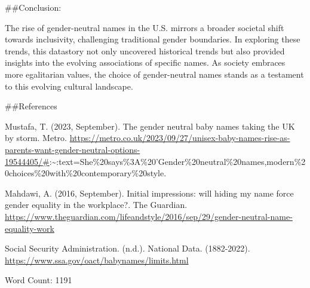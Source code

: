\documentclass[
]{article}
\begin{document}
\#\#Conclusion:

The rise of gender-neutral names in the U.S. mirrors a broader societal
shift towards inclusivity, challenging traditional gender boundaries. In
exploring these trends, this datastory not only uncovered historical
trends but also provided insights into the evolving associations of
specific names. As society embraces more egalitarian values, the choice
of gender-neutral names stands as a testament to this evolving cultural
landscape.

\#\#References

Mustafa, T. (2023, September). The gender neutral baby names taking the
UK by storm. Metro.
\url{https://metro.co.uk/2023/09/27/unisex-baby-names-rise-as-parents-want-gender-neutral-options-19544405/\#}:\textasciitilde:text=She\%20says\%3A\%20'Gender\%20neutral\%20names,modern\%20choices\%20with\%20contemporary\%20style.

Mahdawi, A. (2016, September). Initial impressions: will hiding my name
force gender equality in the workplace?. The Guardian.
\url{https://www.theguardian.com/lifeandstyle/2016/sep/29/gender-neutral-name-equality-work}

Social Security Administration. (n.d.). National Data. (1882-2022).
\url{https://www.ssa.gov/oact/babynames/limits.html}

Word Count: 1191
\end{document}
